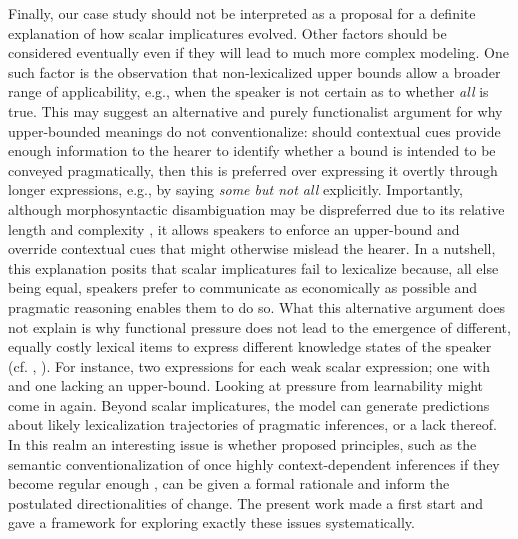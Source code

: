 \documentclass[a4paper, 11pt]{article}
\theoremstyle{Satz}
\begin{document}
Finally, our case study should not be interpreted as a proposal for a definite explanation of
how scalar implicatures evolved. Other factors should be considered eventually even if they
will lead to much more complex modeling. One such factor is the observation that
non-lexicalized upper bounds allow a broader range of applicability, e.g., when the speaker is
not certain as to whether \emph{all} is true. This may suggest an alternative and purely
functionalist argument for why upper-bounded meanings do not conventionalize: should contextual
cues provide enough information to the hearer to identify whether a bound is intended to be
conveyed pragmatically, then this is preferred over expressing it overtly through longer
expressions, e.g., by saying {\em some but not all} explicitly. Importantly, although
morphosyntactic disambiguation may be dispreferred due to its relative length and complexity
\citep{piantadosi+etal:2012b}, it allows speakers to enforce an upper-bound and override
contextual cues that might otherwise mislead the hearer. In a nutshell, this explanation posits
that scalar implicatures fail to lexicalize because, all else being equal, speakers prefer to
communicate as economically as possible and pragmatic reasoning enables them to do so. What
this alternative argument does not explain is why functional pressure does not lead to the
emergence of different, equally costly lexical items to express different knowledge states of
the speaker (cf. \citealt[252-267]{horn:1984},
\citealt{horn:1972,traugott:2004,vdAuwera:2010}). For instance, two expressions for each weak
scalar expression; one with and one lacking an upper-bound.  Looking at pressure from
learnability might come in again. Beyond scalar implicatures, the model can generate predictions about
likely lexicalization trajectories of pragmatic inferences, or a lack thereof. In this realm
an interesting issue is whether proposed principles, such as the semantic conventionalization of once highly context-dependent inferences if they become regular enough \citep{levinson:2000,traugott:2004}, can be given
a formal rationale and inform the postulated directionalities of change. The present work made a first start and gave a framework for
exploring exactly these issues systematically.
\end{document}

